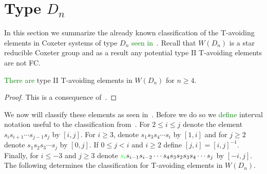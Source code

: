 
\section{Type $D_n$}

In this section we summarize the already known classification of the T-avoiding elements in Coxeter systems of type $D_n$ \textcolor{green}{seen in~\cite{Gern2013a}}. Recall that $W(D_n)$ is a star reducible Coxeter group and as a result any potential type II T-avoiding elements are not FC.

\begin{proposition}
 \textcolor{green}{There are} type II T-avoiding elements in $W(D_n)$ for $n \geq 4$.
\begin{proof}
	This is a consequence of~\cite[Section 2.2]{Gern2013a}. 
\end{proof}
\end{proposition}

We now will classify these elements as seen in~\cite{Gern2013a}. Before we do so we \textcolor{green}{define} interval notation useful to the classification from~\cite[Definition 2.3.1]{Gern2013a}. For $2 \leq i \leq j$ denote the element $s_{i}s_{i+1} \cdots s_{j-1}s_j$ by $[i,j]$. For $i \geq 3$, denote $s_1s_3s_4\cdots s_i$ by $[1,i]$ and for $j \geq 2$ denote $s_1s_2s_3 \cdots s_j$ by $[0,j]$. If $0 \leq j <i$ and $i \geq 2$ define $[j,i]=[i,j]^{-1}$. Finally, for $i \leq -3$ and $j \geq 3$ denote $\textcolor{green}{s_i}s_{i-1}s_{i-2} \cdots s_4s_3s_2s_3s_4 \cdots s_j$ by $[-i,j]$. The following determines the classification for T-avoiding elements in $W(D_n)$. 

